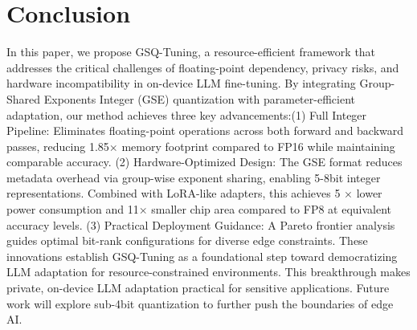 \section{Conclusion} 
\label{sec:conclusion}
\vspace{-2mm}
In this paper, we propose GSQ-Tuning, a resource-efficient framework that addresses the critical challenges of floating-point dependency, privacy risks, and hardware incompatibility in on-device LLM fine-tuning. By integrating Group-Shared Exponents Integer (GSE) quantization with parameter-efficient adaptation, our method achieves three key advancements:(1) Full Integer Pipeline: Eliminates floating-point operations across both forward and backward passes, reducing 1.85$\times$ memory footprint compared to FP16 while maintaining comparable accuracy. (2) Hardware-Optimized Design: The GSE format reduces metadata overhead via group-wise exponent sharing, enabling 5-8bit integer representations. Combined with LoRA-like adapters, this achieves 5 $\times$ lower power consumption and 11$\times$ smaller chip area compared to FP8 at equivalent accuracy levels. (3) Practical Deployment Guidance: A Pareto frontier analysis guides optimal bit-rank configurations for diverse edge constraints. These innovations establish GSQ-Tuning as a foundational step toward democratizing LLM adaptation for resource-constrained environments. This breakthrough makes private, on-device LLM adaptation practical for sensitive applications. Future work will explore sub-4bit quantization to further push the boundaries of edge AI.

